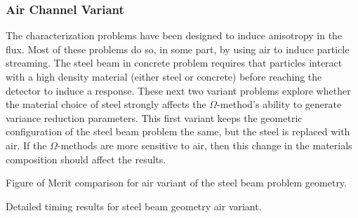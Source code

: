 \subsubsection{Air Channel Variant}
\label{subsubsec:airbeam}

The characterization problems have been designed to induce anisotropy in
the flux. Most of these problems do so, in some part, by using air to induce
particle streaming. The steel beam in concrete problem requires that particles
interact with a high density material (either steel or concrete) before reaching
the detector to induce a response. These next two variant problems explore
whether the material choice of steel strongly affects the $\Omega$-method's
ability to generate variance reduction parameters. This first variant keeps the
geometric configuration of the steel beam problem the same, but the steel is
replaced with air. If the $\Omega$-methods are more sensitive to air, then this
change in the materials composition should affect the results.

\begin{table}[h!]
  \centering
  
  \caption[Figure of Merit comparison for the air variant of the steel beam
  problem geometry.]
  {Figure of Merit comparison for air variant of the steel beam problem geometry.}
  \label{tab:airbeamfoms}
\end{table}

\begin{table}[h!]
  \centering
  
  \caption[Detailed timing results for steel beam geometry air variant.]
  {Detailed timing results for steel beam geometry air variant.}
  \label{tab:airbeamtimes}
\end{table}

